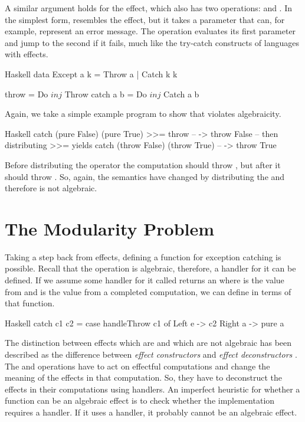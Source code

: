 A similar argument holds for the  effect, which also has two operations:  and . In the simplest form,  resembles the  effect, but it takes a parameter that can, for example, represent an error message. The  operation evaluates its first parameter and jump to the second if it fails, much like the try-catch constructs of languages with effects.

\begin{lst}{Haskell}
data Except a k = Throw a | Catch k k

throw     = Do $ inj $ Throw
catch a b = Do $ inj $ Catch a b
\end{lst}
%
Again, we take a simple example program to show that  violates algebraicity.

\begin{lst}{Haskell}
catch (pure False)  (pure True)  >>= throw -- -> throw False
-- then distributing >>= yields
catch (throw False) (throw True)           -- -> throw True
\end{lst}
%
Before distributing the \hs{>>=} operator the computation should throw , but after it should throw . So, again, the semantics have changed by distributing the \hs{>>=} and therefore  is not algebraic.

\section{The Modularity Problem}

Taking a step back from effects, defining a function for exception catching is possible. Recall that the  operation is algebraic, therefore, a handler for it can be defined. If we assume some handler for it called  returns an  where  is the value from  and  is the value from a completed computation, we can define  in terms of that function.

\begin{lst}{Haskell}
catch c1 c2 =
  case handleThrow c1 of
    Left e -> c2
    Right a -> pure a
\end{lst}
%
The distinction between effects which are and which are not algebraic has been described as the difference between \emph{effect constructors} and \emph{effect deconstructors} \autocite{plotkin_algebraic_2003}. The  and  operations have to act on effectful computations and change the meaning of the effects in that computation. So, they have to deconstruct the effects in their computations using handlers. An imperfect heuristic for whether a function can be an algebraic effect is to check whether the implementation requires a handler. If it uses a handler, it probably cannot be an algebraic effect.

